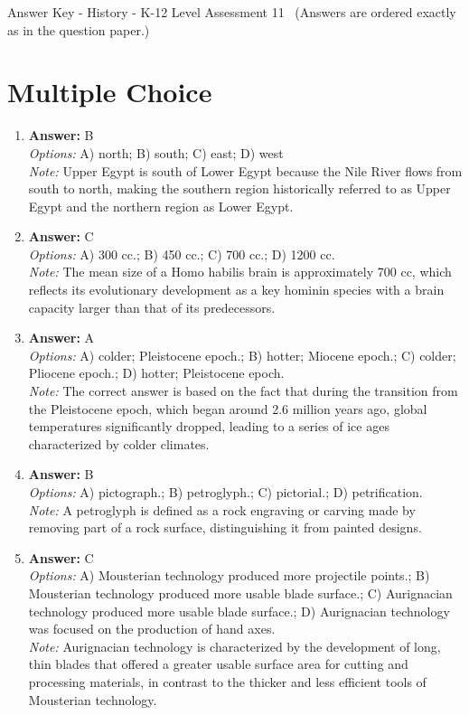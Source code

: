 \documentclass[12pt]{article}
\begin{document}
\begin{center}
Answer Key - History - K-12 Level Assessment 11 \
\small (Answers are ordered exactly as in the question paper.)
\end{center}

\section*{Multiple Choice}
\begin{enumerate}[label=\arabic*.]
\item \textbf{Answer:} B
\\ \textit{Options:} A) north; B) south; C) east; D) west
\\ \textit{Note:} Upper Egypt is south of Lower Egypt because the Nile River flows from south to north, making the southern region historically referred to as Upper Egypt and the northern region as Lower Egypt.
\item \textbf{Answer:} C
\\ \textit{Options:} A) 300 cc.; B) 450 cc.; C) 700 cc.; D) 1200 cc.
\\ \textit{Note:} The mean size of a Homo habilis brain is approximately 700 cc, which reflects its evolutionary development as a key hominin species with a brain capacity larger than that of its predecessors.
\item \textbf{Answer:} A
\\ \textit{Options:} A) colder; Pleistocene epoch.; B) hotter; Miocene epoch.; C) colder; Pliocene epoch.; D) hotter; Pleistocene epoch.
\\ \textit{Note:} The correct answer is based on the fact that during the transition from the Pleistocene epoch, which began around 2.6 million years ago, global temperatures significantly dropped, leading to a series of ice ages characterized by colder climates.
\item \textbf{Answer:} B
\\ \textit{Options:} A) pictograph.; B) petroglyph.; C) pictorial.; D) petrification.
\\ \textit{Note:} A petroglyph is defined as a rock engraving or carving made by removing part of a rock surface, distinguishing it from painted designs.
\item \textbf{Answer:} C
\\ \textit{Options:} A) Mousterian technology produced more projectile points.; B) Mousterian technology produced more usable blade surface.; C) Aurignacian technology produced more usable blade surface.; D) Aurignacian technology was focused on the production of hand axes.
\\ \textit{Note:} Aurignacian technology is characterized by the development of long, thin blades that offered a greater usable surface area for cutting and processing materials, in contrast to the thicker and less efficient tools of Mousterian technology.
\end{enumerate}
\end{document}
